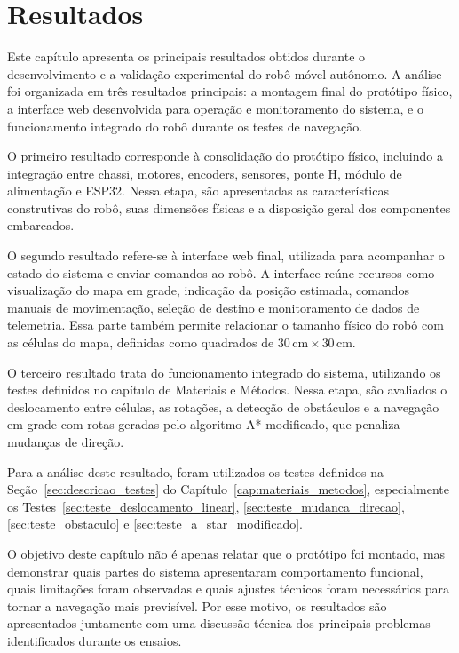 \documentclass[	12pt, Times, openright, twoside, a4paper, english, brazil]{abntex2}
\begin{document}
\chapter{Resultados} \label{chap:resultados}

Este capítulo apresenta os principais resultados obtidos durante o desenvolvimento e a validação experimental do robô móvel autônomo. A análise foi organizada em três resultados principais: a montagem final do protótipo físico, a interface web desenvolvida para operação e monitoramento do sistema, e o funcionamento integrado do robô durante os testes de navegação.

O primeiro resultado corresponde à consolidação do protótipo físico, incluindo a integração entre chassi, motores, encoders, sensores, ponte H, módulo de alimentação e ESP32. Nessa etapa, são apresentadas as características construtivas do robô, suas dimensões físicas e a disposição geral dos componentes embarcados.

O segundo resultado refere-se à interface web final, utilizada para acompanhar o estado do sistema e enviar comandos ao robô. A interface reúne recursos como visualização do mapa em grade, indicação da posição estimada, comandos manuais de movimentação, seleção de destino e monitoramento de dados de telemetria. Essa parte também permite relacionar o tamanho físico do robô com as células do mapa, definidas como quadrados de $30\,\text{cm} \times 30\,\text{cm}$.

O terceiro resultado trata do funcionamento integrado do sistema, utilizando os testes definidos no capítulo de Materiais e Métodos. Nessa etapa, são avaliados o deslocamento entre células, as rotações, a detecção de obstáculos e a navegação em grade com rotas geradas pelo algoritmo A* modificado, que penaliza mudanças de direção.

Para a análise deste resultado, foram utilizados os testes definidos na Seção~\ref{sec:descricao_testes} do Capítulo~\ref{cap:materiais_metodos}, especialmente os Testes~\ref{sec:teste_deslocamento_linear}, \ref{sec:teste_mudanca_direcao}, \ref{sec:teste_obstaculo} e \ref{sec:teste_a_star_modificado}.

O objetivo deste capítulo não é apenas relatar que o protótipo foi montado, mas demonstrar quais partes do sistema apresentaram comportamento funcional, quais limitações foram observadas e quais ajustes técnicos foram necessários para tornar a navegação mais previsível. Por esse motivo, os resultados são apresentados juntamente com uma discussão técnica dos principais problemas identificados durante os ensaios.
\end{document}
